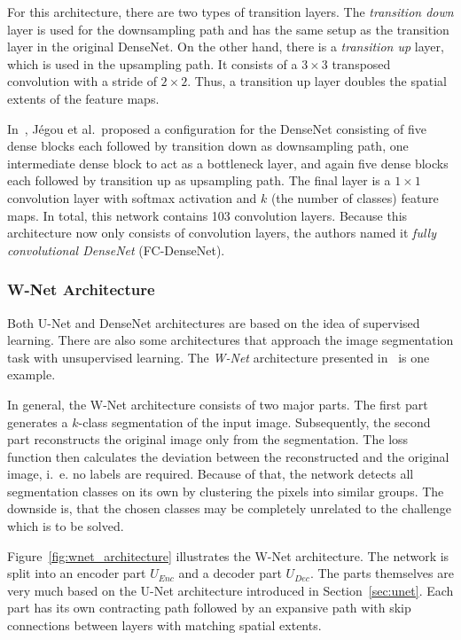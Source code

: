 For this architecture, there are two types of transition layers. The \emph{transition down} layer is used for the downsampling path and has the same setup as the transition layer in the original DenseNet. On the other hand, there is a \emph{transition up} layer, which is used in the upsampling path. It consists of a $3\times 3$ transposed convolution with a stride of $2\times 2$. Thus, a transition up layer doubles the spatial extents of the feature maps.

In~\cite{denseseg17}, Jégou et al.\ proposed a configuration for the DenseNet consisting of five dense blocks each followed by transition down as downsampling path, one intermediate dense block to act as a bottleneck layer, and again five dense blocks each followed by transition up as upsampling path. The final layer is a $1\times 1$ convolution layer with softmax activation and $k$ (the number of classes) feature maps. In total, this network contains 103 convolution layers. Because this architecture now only consists of convolution layers, the authors named it \emph{fully convolutional DenseNet} (FC-DenseNet).

\subsubsection{W-Net Architecture}
\label{sec:w-net}
Both U-Net and DenseNet architectures are based on the idea of supervised learning. There are also some architectures that approach the image segmentation task with unsupervised learning. The \emph{W-Net} architecture presented in~\cite{wnet17} is one example.

In general, the W-Net architecture consists of two major parts. The first part generates a $k$-class segmentation of the input image. Subsequently, the second part reconstructs the original image only from the segmentation. The loss function then calculates the deviation between the reconstructed and the original image, i.~e. no labels are required. Because of that, the network detects all segmentation classes on its own by clustering the pixels into similar groups. The downside is, that the chosen classes may be completely unrelated to the challenge which is to be solved.

Figure~\ref{fig:wnet_architecture} illustrates the W-Net architecture. The network is split into an encoder part $U_{Enc}$ and a decoder part $U_{Dec}$. The parts themselves are very much based on the U-Net architecture introduced in Section~\ref{sec:unet}. Each part has its own contracting path followed by an expansive path with skip connections between layers with matching spatial extents.

